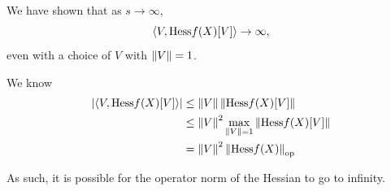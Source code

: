 \documentclass[letterpaper, 10 pt, conference, onecolumn]{ieeeconf}
\theoremstyle{definition}
\theoremstyle{plain}
\begin{document}
We have shown that as $s\to\infty$,
\begin{equation}
    \langle V, \text{Hess} f(X)[V] \rangle \to \infty,
\end{equation}
even with a choice of $V$ with $\left\lVert V \right\rVert=1$.

We know
\begin{align}
    | \langle V, \text{Hess} f(X)[V] \rangle |
    &\leq \left\lVert V \right\rVert \left\lVert \text{Hess} f(X)[V] \right\rVert
    \\
    &\leq \left\lVert V \right\rVert^2 \max_{\left\lVert V \right\rVert=1} \left\lVert \text{Hess} f(X)[V] \right\rVert 
    \\
    &= \left\lVert V \right\rVert^2 \left\lVert \text{Hess} f(X) \right\rVert_{\text{op}} 
\end{align}

As such, it is possible for the operator norm of the Hessian to go to infinity.


\newpage



\end{document}
